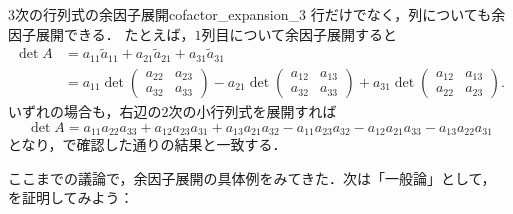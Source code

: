 \begin{example}{3次の行列式の余因子展開}{cofactor_expansion_3}
  行だけでなく，列についても余因子展開できる．
  たとえば，$1$列目について余因子展開すると
  \begin{align*}
    \det A
    &= a_{11}\tilde{a}_{11} + a_{21}\tilde{a}_{21} + a_{31}\tilde{a}_{31} \\
    &= a_{11}\det\begin{pmatrix}
      a_{22} & a_{23} \\
      a_{32} & a_{33}
    \end{pmatrix}
    - a_{21}\det\begin{pmatrix}
      a_{12} & a_{13} \\
      a_{32} & a_{33}
    \end{pmatrix}
    + a_{31}\det\begin{pmatrix}
      a_{12} & a_{13} \\
      a_{22} & a_{23}
    \end{pmatrix}.
  \end{align*}
  いずれの場合も，右辺の$2$次の小行列式を展開すれば
  \[
  \det A = a_{11}a_{22}a_{33} + a_{12}a_{23}a_{31} + a_{13}a_{21}a_{32}
         - a_{11}a_{23}a_{32} - a_{12}a_{21}a_{33} - a_{13}a_{22}a_{31}
  \]
  となり，で確認した通りの結果と一致する．
\end{example}

ここまでの議論で，余因子展開の具体例をみてきた．次は「一般論」として， を証明してみよう：

